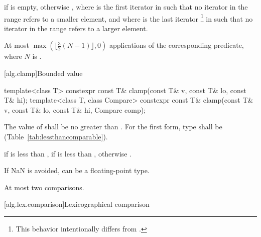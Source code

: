 \begin{itemdescr}
\pnum
\returns
{} if  is empty, otherwise
, where  is
the first iterator in  such that no iterator in the range refers to a smaller element, and where  is the last iterator
\footnote{This behavior intentionally differs from .}
in  such that no iterator in the range refers to a larger element.

\pnum
\complexity
At most
$\max(\lfloor{\frac{3}{2}} (N-1)\rfloor, 0)$
applications of the corresponding predicate, where $N$ is .
\end{itemdescr}

[alg.clamp]{Bounded value}

%
\begin{itemdecl}
template<class T>
  constexpr const T& clamp(const T& v, const T& lo, const T& hi);
template<class T, class Compare>
  constexpr const T& clamp(const T& v, const T& lo, const T& hi, Compare comp);
\end{itemdecl}

\begin{itemdescr}
\pnum
\requires
The value of  shall be no greater than .
For the first form, type 
shall be  (Table~\ref{tab:lessthancomparable}).

\pnum
\returns
{} if  is less than ,
 if  is less than ,
otherwise .

\pnum
\begin{note}
If NaN is avoided,  can be a floating-point type.
\end{note}

\pnum
\complexity
At most two comparisons.
\end{itemdescr}

[alg.lex.comparison]{Lexicographical comparison}

